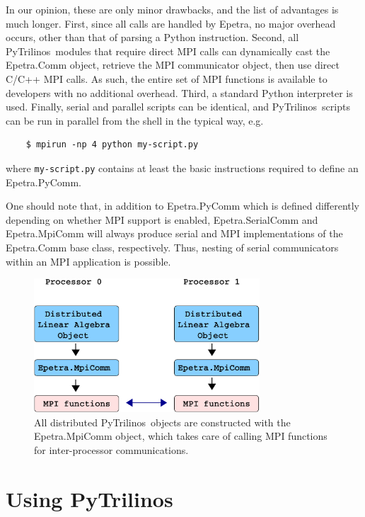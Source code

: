 \documentclass[acmtocl]{acmtrans2m}
\newcommand{\PyTrilinos}{{PyTrilinos}}
\begin{document}
In our opinion, these are only minor drawbacks, and the list of
advantages is much longer.  First, since all calls are handled by
Epetra, no major overhead occurs, other than that of parsing a Python
instruction.  Second, all \PyTrilinos\ modules that require direct MPI
calls can dynamically cast the Epetra.Comm object, retrieve the MPI
communicator object, then use direct C/C++ MPI calls.  As such, the
entire set of MPI functions is available to developers with no
additional overhead.  Third, a standard Python interpreter is used.
Finally, serial and parallel scripts can be identical, and \PyTrilinos\
scripts can be run in parallel from the shell in the typical way, e.g.
\begin{verbatim}
    $ mpirun -np 4 python my-script.py
\end{verbatim}
where {\tt my-script.py} contains at least the basic instructions
required to define an Epetra.PyComm.

One should note that, in addition to Epetra.PyComm which is defined
differently depending on whether MPI support is enabled,
Epetra.SerialComm and Epetra.MpiComm will always produce serial and
MPI implementations of the Epetra.Comm base class, respectively.
Thus, nesting of serial communicators within an MPI application is
possible.

\begin{figure}
  \begin{center}
    \includegraphics[height=5cm]{distributed_object}
    \caption{All distributed \PyTrilinos\ objects are constructed with
      the Epetra.MpiComm object, which takes care of calling MPI
      functions for inter-processor communications.}
    \label{fig:distributed}
  \end{center}
\end{figure}

\section{Using \PyTrilinos}
\label{sec:using}
\end{document}
